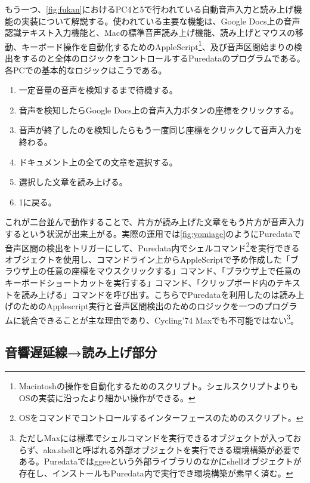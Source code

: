 \documentclass[a4paper,report]{jsbook}
\begin{document}
もう一つ、\cref{fig:fukan}におけるPC4と5で行われている自動音声入力と読み上げ機能の実装について解説する。使われている主要な機能は、Google
Docs上の音声認識テキスト入力機能と、Macの標準音声読み上げ機能、読み上げとマウスの移動、キーボード操作を自動化するためのAppleScript\footnote{Macintoshの操作を自動化するためのスクリプト。シェルスクリプトよりもOSの実装に沿ったより細かい操作ができる。}、及び音声区間始まりの検出をするのと全体のロジックをコントロールするPuredataのプログラムである。各PCでの基本的なロジックはこうである。

\begin{enumerate}
\def\labelenumi{\arabic{enumi}.}
\tightlist
\item
  一定音量の音声を検知するまで待機する。
\item
  音声を検知したらGoogle Docs上の音声入力ボタンの座標をクリックする。
\item
  音声が終了したのを検知したらもう一度同じ座標をクリックして音声入力を終わる。
\item
  ドキュメント上の全ての文章を選択する。
\item
  選択した文章を読み上げる。
\item
  1に戻る。
\end{enumerate}

これが二台並んで動作することで、片方が読み上げた文章をもう片方が音声入力するという状況が出来上がる。実際の運用では\cref{fig:yomiage}のようにPuredataで音声区間の検出をトリガーにして、Puredata内でシェルコマンド\footnote{OSをコマンドでコントロールするインターフェースのためのスクリプト。}を実行できるオブジェクトを使用し、コマンドライン上からAppleScriptで予め作成した「ブラウザ上の任意の座標をマウスクリックする」コマンド、「ブラウザ上で任意のキーボードショートカットを実行する」コマンド、「クリップボード内のテキストを読み上げる」コマンドを呼び出す。こちらでPuredataを利用したのは読み上げのためのApplescript実行と音声区間検出のためのロジックを一つのプログラムに統合できることが主な理由であり、Cycling'74
Maxでも不可能ではない\footnote{ただしMaxには標準でシェルコマンドを実行できるオブジェクトが入っておらず、aka.shellと呼ばれる外部オブジェクトを実行できる環境構築が必要である。Puredataではggeeという外部ライブラリのなかにshellオブジェクトが存在し、インストールもPuredata内で実行でき環境構築が素早く済む。}。

\subsection{音響遅延線→読み上げ部分}\label{ux97f3ux97ffux9045ux5ef6ux7ddaux8aadux307fux4e0aux3052ux90e8ux5206}
\end{document}
